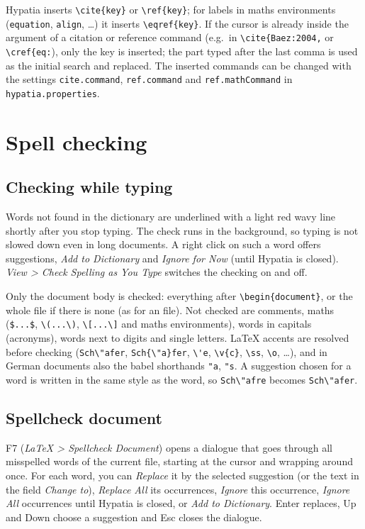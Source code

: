 \documentclass[11pt]{article}
\newcommand{\key}[1]{\textsf{#1}}
\newcommand{\menu}[1]{\textsf{\textit{#1}}}
\newcommand{\file}[1]{\texttt{#1}}
\begin{document}
    Hypatia inserts \verb+\cite{key}+ or \verb+\ref{key}+; for labels in maths environments (\verb+equation+, \verb+align+, \ldots) it inserts \verb+\eqref{key}+. If the cursor is already inside the argument of a citation or reference command (e.g.\ in \verb+\cite{Baez:2004,+ or \verb+\cref{eq:+), only the key is inserted; the part typed after the last comma is used as the initial search and replaced. The inserted commands can be changed with the settings \verb+cite.command+, \verb+ref.command+ and \verb+ref.mathCommand+ in \file{hypatia.properties}.


    \section{Spell checking}\label{sec:spelling}

    \subsection{Checking while typing}

    Words not found in the dictionary are underlined with a light red wavy line shortly after you stop typing. The check runs in the background, so typing is not slowed down even in long documents. A right click on such a word offers suggestions, \menu{Add to Dictionary} and \menu{Ignore for Now} (until Hypatia is closed). \menu{View > Check Spelling as You Type} switches the checking on and off.

    Only the document body is checked: everything after \verb+\begin{document}+, or the whole file if there is none (as for an \verb++ file). Not checked are comments, maths (\verb+$...$+, \verb+\(...\)+, \verb+\[...\]+ and maths environments), words in capitals (acronyms), words next to digits and single letters. LaTeX accents are resolved before checking (\verb+Sch\"afer+, \verb+Sch{\"a}fer+, \verb+\'e+, \verb+\v{c}+, \verb+\ss+, \verb+\o+, \ldots), and in German documents also the babel shorthands \verb+"a+, \verb+"s+. A suggestion chosen for a word is written in the same style as the word, so \verb+Sch\"afre+ becomes \verb+Sch\"afer+.

    \subsection{Spellcheck document}

    \key{F7} (\menu{LaTeX > Spellcheck Document}) opens a dialogue that goes through all misspelled words of the current file, starting at the cursor and wrapping around once. For each word, you can \emph{Replace} it by the selected suggestion (or the text in the field \emph{Change to}), \emph{Replace All} its occurrences, \emph{Ignore} this occurrence, \emph{Ignore All} occurrences until Hypatia is closed, or \emph{Add to Dictionary}. \key{Enter} replaces, \key{Up} and \key{Down} choose a suggestion and \key{Esc} closes the dialogue.
\end{document}
